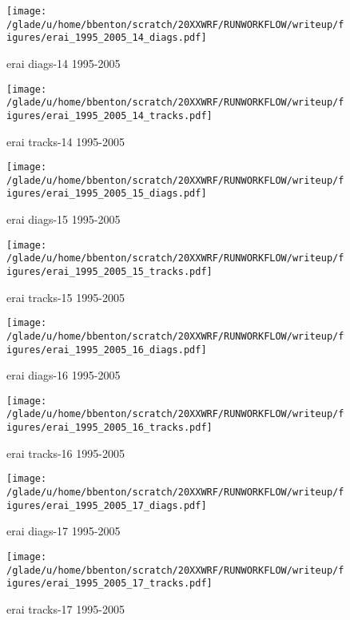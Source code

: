 \begin{figure}[!tbp]
\centering
\begin{minipage}[b]{0.45\textwidth}
\texttt{[image: /glade/u/home/bbenton/scratch/20XXWRF/RUNWORKFLOW/writeup/figures/erai\_1995\_2005\_14\_diags.pdf]}
\caption{erai diags-14 1995-2005}
\end{minipage}
\hfill
\begin{minipage}[b]{0.45\textwidth}
\texttt{[image: /glade/u/home/bbenton/scratch/20XXWRF/RUNWORKFLOW/writeup/figures/erai\_1995\_2005\_14\_tracks.pdf]}
\caption{erai tracks-14 1995-2005}
\end{minipage}
\end{figure}

\begin{figure}[!tbp]
\centering
\begin{minipage}[b]{0.45\textwidth}
\texttt{[image: /glade/u/home/bbenton/scratch/20XXWRF/RUNWORKFLOW/writeup/figures/erai\_1995\_2005\_15\_diags.pdf]}
\caption{erai diags-15 1995-2005}
\end{minipage}
\hfill
\begin{minipage}[b]{0.45\textwidth}
\texttt{[image: /glade/u/home/bbenton/scratch/20XXWRF/RUNWORKFLOW/writeup/figures/erai\_1995\_2005\_15\_tracks.pdf]}
\caption{erai tracks-15 1995-2005}
\end{minipage}
\end{figure}

\begin{figure}[!tbp]
\centering
\begin{minipage}[b]{0.45\textwidth}
\texttt{[image: /glade/u/home/bbenton/scratch/20XXWRF/RUNWORKFLOW/writeup/figures/erai\_1995\_2005\_16\_diags.pdf]}
\caption{erai diags-16 1995-2005}
\end{minipage}
\hfill
\begin{minipage}[b]{0.45\textwidth}
\texttt{[image: /glade/u/home/bbenton/scratch/20XXWRF/RUNWORKFLOW/writeup/figures/erai\_1995\_2005\_16\_tracks.pdf]}
\caption{erai tracks-16 1995-2005}
\end{minipage}
\end{figure}

\begin{figure}[!tbp]
\centering
\begin{minipage}[b]{0.45\textwidth}
\texttt{[image: /glade/u/home/bbenton/scratch/20XXWRF/RUNWORKFLOW/writeup/figures/erai\_1995\_2005\_17\_diags.pdf]}
\caption{erai diags-17 1995-2005}
\end{minipage}
\hfill
\begin{minipage}[b]{0.45\textwidth}
\texttt{[image: /glade/u/home/bbenton/scratch/20XXWRF/RUNWORKFLOW/writeup/figures/erai\_1995\_2005\_17\_tracks.pdf]}
\caption{erai tracks-17 1995-2005}
\end{minipage}
\end{figure}

